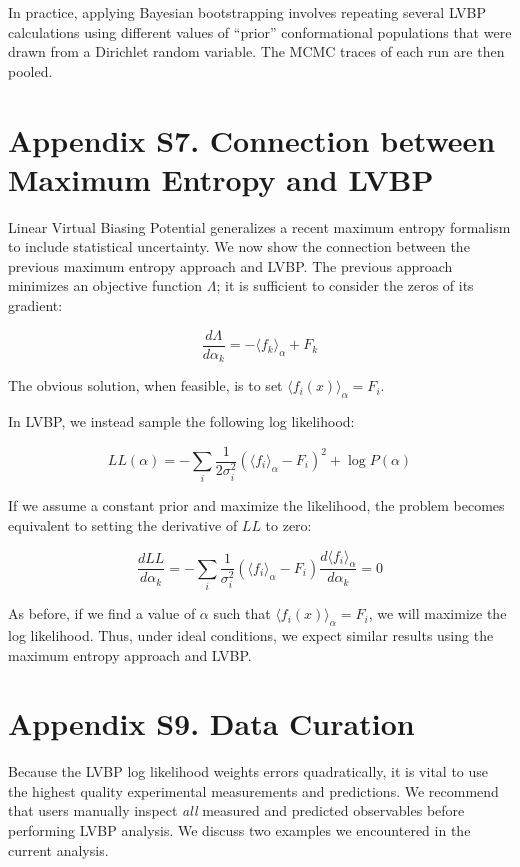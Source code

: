 \documentclass[journal=jacsat,manuscript=article]{achemso}
\begin{document}
In practice, applying Bayesian bootstrapping involves repeating several LVBP calculations using different values of ``prior'' conformational populations that were drawn from a Dirichlet random variable.  The MCMC traces of each run are then pooled.  

\section{Appendix S7.  Connection between Maximum Entropy and LVBP}


Linear Virtual Biasing Potential generalizes a recent maximum entropy formalism \cite{chodera2012} to include statistical uncertainty.  We now show the connection between the previous maximum entropy approach \cite{chodera2012} and LVBP.  The previous approach minimizes an objective function $\Lambda$; it is sufficient to consider the zeros of its gradient:

$$\frac{d\Lambda}{d\alpha_k} = -\langle f_k \rangle_\alpha + F_k$$

The obvious solution, when feasible, is to set $\langle f_i(x) \rangle_\alpha = F_i$.  

In LVBP, we instead sample the following log likelihood:

$$LL(\alpha) = -\sum_i \frac{1}{2\sigma_i^2}(\langle f_i\rangle _\alpha - F_i)^2 + \log P(\alpha)$$

If we assume a constant prior and maximize the likelihood, the problem becomes equivalent to setting the derivative of $LL$ to zero:

$$ \frac{dLL}{d\alpha_k} =  -\sum_i \frac{1}{\sigma_i^2} (\langle f_i\rangle _\alpha - F_i) \frac{d\langle f_i\rangle _\alpha}{d\alpha_k} = 0$$

As before, if we find a value of $\alpha$ such that $\langle f_i(x) \rangle_\alpha = F_i$, we will maximize the log likelihood.  Thus, under ideal conditions, we expect similar results using the maximum entropy approach and LVBP.  

\clearpage %

\section{Appendix S9. Data Curation}

Because the LVBP log likelihood weights errors quadratically, it is vital to use the highest quality experimental measurements and predictions.  We recommend that users manually inspect \emph{all} measured and predicted observables before performing LVBP analysis.  We discuss two examples we encountered in the current analysis.  
\end{document}

